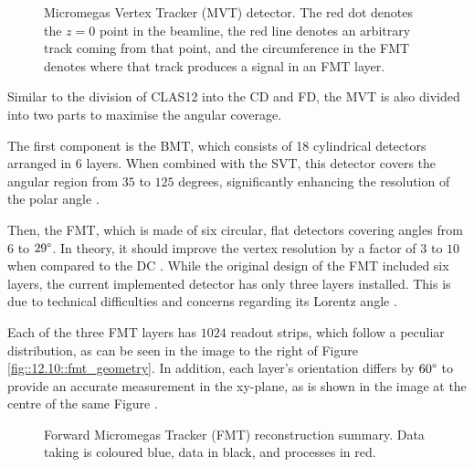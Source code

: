     \begin{figure}[b!]
        \caption[MVT detector.]
        {Micromegas Vertex Tracker (MVT) detector.
        The red dot denotes the $z=0$ point in the beamline, the red line denotes an arbitrary track coming from that point, and the circumference in the FMT denotes where that track produces a signal in an FMT layer.}
        \label{fig::12.10::micromegas_vertex_tracker}
    \end{figure}

    Similar to the division of CLAS12 into the CD and FD, the MVT is also divided into two parts to maximise the angular coverage.

    The first component is the BMT, which consists of 18 cylindrical detectors arranged in 6 layers.
    When combined with the SVT, this detector covers the angular region from $35$ to $125$ degrees, significantly enhancing the resolution of the polar angle \cite{acker2020mvt}.

    Then, the FMT, which is made of six circular, flat detectors covering angles from $6$ to $29\degree$.
    In theory, it should improve the vertex resolution by a factor of $3$ to $10$ when compared to the DC \cite{aune2009}.
    While the original design of the FMT included six layers, the current implemented detector has only three layers installed.
    This is due to technical difficulties and concerns regarding its Lorentz angle \cite{konczykowski2010}.

    Each of the three FMT layers has $1024$ readout strips, which follow a peculiar distribution, as can be seen in the image to the right of Figure \ref{fig::12.10::fmt_geometry}.
    In addition, each layer's orientation differs by $60\degree$ to provide an accurate measurement in the xy-plane, as is shown in the image at the centre of the same Figure \cite{acker2020mvt}.

    \begin{wrapfigure}{r}{0.50\textwidth}
        \caption[FMT reconstruction summary]
        {Forward Micromegas Tracker (FMT) reconstruction summary.
        Data taking is coloured blue, data in black, and processes in red.}
        \label{fig::12.11::fmt_reconstruction}
    \end{wrapfigure}

